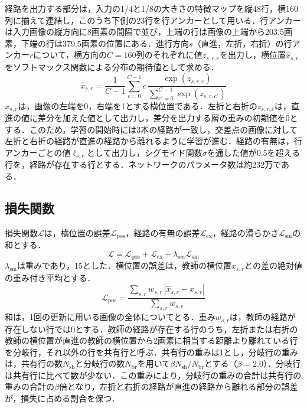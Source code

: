経路を出力する部分は，入力の1/4と1/8の大きさの特徴マップを縦48行，横160列に揃えて連結し，このうち下側の23行を行アンカーとして用いる．行アンカーは入力画像の縦方向に8画素の間隔で並び，上端の行は画像の上端から203.5画素，下端の行は379.5画素の位置にある．進行方向$s$（直進，左折，右折）の行アンカー$r$について，横方向の$C=160$列のそれぞれに値$z_{s,r,c}$を出力し，横位置$\hat{x}_{s,r}$をソフトマックス関数による分布の期待値として求める．
\begin{equation}
  \hat{x}_{s,r} = \frac{1}{C-1}\sum_{c=0}^{C-1} c\,\frac{\exp(z_{s,r,c})}{\sum_{c'=0}^{C-1}\exp(z_{s,r,c'})}
  \label{eq:softargmax}
\end{equation}
$\hat{x}_{s,r}$は，画像の左端を0，右端を1とする横位置である．左折と右折の$z_{s,r,c}$は，直進の値に差分を加えた値として出力し，差分を出力する層の重みの初期値を0とする．このため，学習の開始時には3本の経路が一致し，交差点の画像に対して左折と右折の経路が直進の経路から離れるように学習が進む．経路の有無は，行アンカーごとの値$\ell_{s,r}$として出力し，シグモイド関数$\sigma$を通した値が0.5を超える行を，経路が存在する行とする．ネットワークのパラメータ数は約232万である．

\subsection{損失関数}
\label{sec:loss}
損失関数$\mathcal{L}$は，横位置の誤差$\mathcal{L}_{\mathrm{pos}}$，経路の有無の誤差$\mathcal{L}_{\mathrm{ex}}$，経路の滑らかさ$\mathcal{L}_{\mathrm{sm}}$の和とする．
\begin{equation}
  \mathcal{L} = \mathcal{L}_{\mathrm{pos}} + \mathcal{L}_{\mathrm{ex}} + \lambda_{\mathrm{sm}} \mathcal{L}_{\mathrm{sm}}
  \label{eq:loss}
\end{equation}
$\lambda_{\mathrm{sm}}$は重みであり，15とした．横位置の誤差は，教師の横位置$x_{s,r}$との差の絶対値の重み付き平均とする．
\begin{equation}
  \mathcal{L}_{\mathrm{pos}} = \frac{\sum_{s,r} w_{s,r}\,|\hat{x}_{s,r}-x_{s,r}|}{\sum_{s,r} w_{s,r}}
  \label{eq:loss_pos}
\end{equation}
和は，1回の更新に用いる画像の全体についてとる．重み$w_{s,r}$は，教師の経路が存在しない行では0とする．教師の経路が存在する行のうち，左折または右折の教師の横位置が直進の教師の横位置から2画素に相当する距離より離れている行を分岐行，それ以外の行を共有行と呼ぶ．共有行の重みは1とし，分岐行の重みは，共有行の数$N_{\mathrm{sh}}$と分岐行の数$N_{\mathrm{br}}$を用いて$\beta N_{\mathrm{sh}}/N_{\mathrm{br}}$とする（$\beta=2.0$）．分岐行は共有行に比べて数が少ない．この重みにより，分岐行の重みの合計は共有行の重みの合計の$\beta$倍となり，左折と右折の経路が直進の経路から離れる部分の誤差が，損失に占める割合を保つ．

